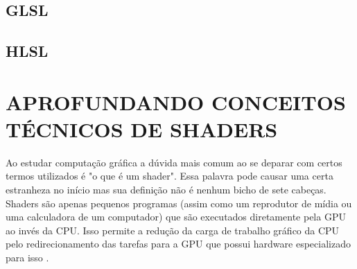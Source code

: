 \subsection{GLSL}
\label{sec:glsl}

\subsection{HLSL}
\label{sec:hlsl}


\section{APROFUNDANDO CONCEITOS TÉCNICOS DE SHADERS}
\label{sec:shaders-e-sua-definicao}

Ao estudar computação gráfica a dúvida mais comum ao se deparar com certos termos utilizados é "o que é um shader". Essa palavra pode causar uma certa estranheza no início mas sua definição não é nenhum bicho de sete cabeças. Shaders são apenas pequenos programas (assim como um reprodutor de mídia ou uma calculadora de um computador) que são executados diretamente pela \acrshort{GPU} ao invés da \acrshort{CPU}. Isso permite a redução da carga de trabalho gráfico da \acrshort{CPU} pelo redirecionamento das tarefas para a \acrshort{GPU} que possui hardware especializado para isso \cite{openGLBook}.

	\begin{figure}[h!]
		\centering
	\end{figure}
	\nocite{figura5}

